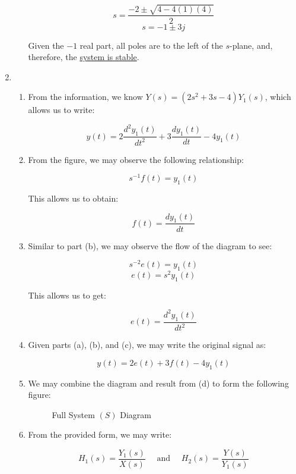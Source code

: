 \begin{enumerate}
\begin{enumerate}
        $$s=\frac{-2\pm\sqrt{4-4(1)(4)}}{2}$$
        $$s=-1\pm 3j$$

        Given the $-1$ real part, all poles are to the left of the $s$-plane, and, therefore, the \underline{system is stable}.

    \end{enumerate}

  \item

    \begin{enumerate}

      \item From the information,  we know $Y(s)=(2s^2+3s-4)Y_1(s)$, which allows us to write:

        $$\boxed{y(t)=2\frac{d^2y_1(t)}{dt^2}+3\frac{dy_1(t)}{dt}-4y_1(t)}$$

      \item From the figure, we may observe the following relationship:

        $$s^{-1}f(t)=y_1(t)$$

        This allows us to obtain:

        $$\boxed{f(t)=\frac{dy_1(t)}{dt}}$$

      \item Similar to part (b), we may observe the flow of the diagram to see:

        $$s^{-2}e(t)=y_1(t)$$
        $$e(t)=s^2y_1(t)$$

        This allows us to get:

        $$\boxed{e(t)=\frac{d^2y_1(t)}{dt^2}}$$

      \item Given parts (a), (b), and (c), we may write the original signal as:

        $$\boxed{y(t)=2e(t)+3f(t)-4y_1(t)}$$

      \item 

        We may combine the diagram and result from (d) to form the following figure:

        \begin{figure}[H]
          \centering
          
          \caption{Full System $(S)$ Diagram}
          \label{fig:2}
        \end{figure}

      \item From the provided form, we may write:

        $$H_1(s)=\frac{Y_1(s)}{X(s)}\quad\text{ and }\quad H_2(s)=\frac{Y(s)}{Y_1(s)}$$


\end{enumerate}
\end{enumerate}
